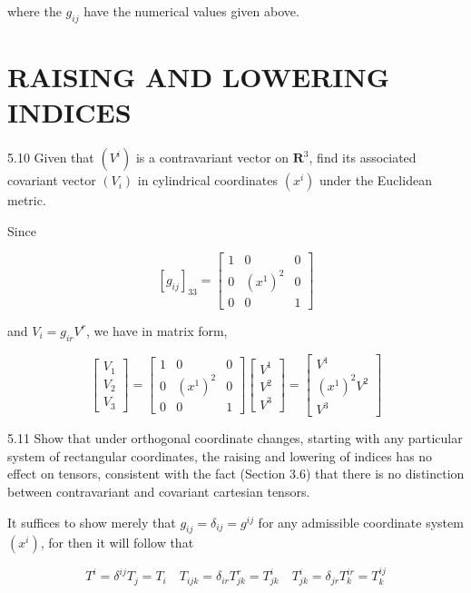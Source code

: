 \documentclass[10pt]{article}
\begin{document}
where the $g_{i j}$ have the numerical values given above.

\section*{RAISING AND LOWERING INDICES}
5.10 Given that $\left(V^{i}\right)$ is a contravariant vector on $\mathbf{R}^{3}$, find its associated covariant vector $\left(V_{i}\right)$ in cylindrical coordinates $\left(x^{i}\right)$ under the Euclidean metric.

Since

$$
\left[g_{i j}\right]_{33}=\left[\begin{array}{ccc}
1 & 0 & 0 \\
0 & \left(x^{1}\right)^{2} & 0 \\
0 & 0 & 1
\end{array}\right]
$$

and $V_{i}=g_{i r} V^{r}$, we have in matrix form,

$$
\left[\begin{array}{l}
V_{1} \\
V_{2} \\
V_{3}
\end{array}\right]=\left[\begin{array}{ccc}
1 & 0 & 0 \\
0 & \left(x^{1}\right)^{2} & 0 \\
0 & 0 & 1
\end{array}\right]\left[\begin{array}{l}
V^{1} \\
V^{2} \\
V^{3}
\end{array}\right]=\left[\begin{array}{c}
V^{1} \\
\left(x^{1}\right)^{2} V^{2} \\
V^{3}
\end{array}\right]
$$

5.11 Show that under orthogonal coordinate changes, starting with any particular system of rectangular coordinates, the raising and lowering of indices has no effect on tensors, consistent with the fact (Section 3.6) that there is no distinction between contravariant and covariant cartesian tensors.

It suffices to show merely that $g_{i j}=\delta_{i j}=g^{i j}$ for any admissible coordinate system $\left(x^{i}\right)$, for then it will follow that

$$
T^{i}=\delta^{i j} T_{j}=T_{i} \quad T_{i j k}=\delta_{i r} T_{j k}^{r}=T_{j k}^{i} \quad T_{j k}^{i}=\delta_{j r} T_{k}^{i r}=T_{k}^{i j}
$$
\end{document}
